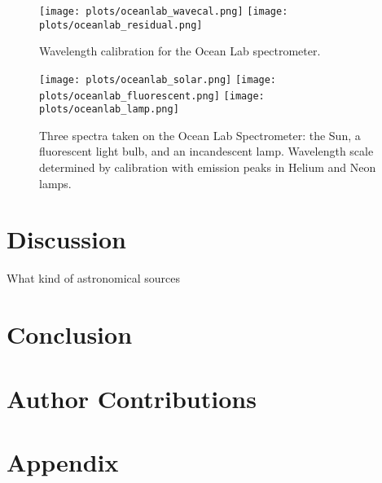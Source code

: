 \documentclass[preprint]{aastex62}
\begin{document}
\begin{figure}[]
\begin{center}
\texttt{[image: plots/oceanlab\_wavecal.png]}
\texttt{[image: plots/oceanlab\_residual.png]}
\caption{Wavelength calibration for the Ocean Lab spectrometer.}
\end{center}
\end{figure}


\begin{figure}[]
\begin{center}
\texttt{[image: plots/oceanlab\_solar.png]}
\texttt{[image: plots/oceanlab\_fluorescent.png]}
\texttt{[image: plots/oceanlab\_lamp.png]}
\caption{Three spectra taken on the Ocean Lab Spectrometer: the Sun, a fluorescent light bulb, and an incandescent lamp. Wavelength scale determined by calibration with emission peaks in Helium and Neon lamps.}
\end{center}
\end{figure}

\section{Discussion} \label{sec:discussion}
What kind of astronomical sources

\section{Conclusion}


\section{Author Contributions}


\newpage
\section{Appendix}

\end{document}
